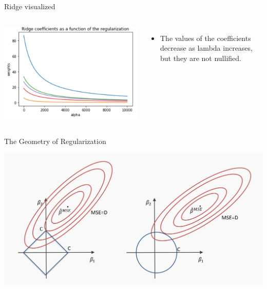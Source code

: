 \begin{frame}{Ridge visualized}
\begin{columns}
    \includegraphics[width=\linewidth]{images/linear-regression/linear-regression-31.png}
    \begin{itemize}
        \item The values of the coefficients decrease as lambda increases, but they are not nullified.
    \end{itemize}
\end{columns}

\end{frame}


\begin{frame}{The Geometry of Regularization}

\begin{center}
    \includegraphics[width=0.9\linewidth]{images/linear-regression/linear-regression-32.png}
\end{center}

\end{frame}


